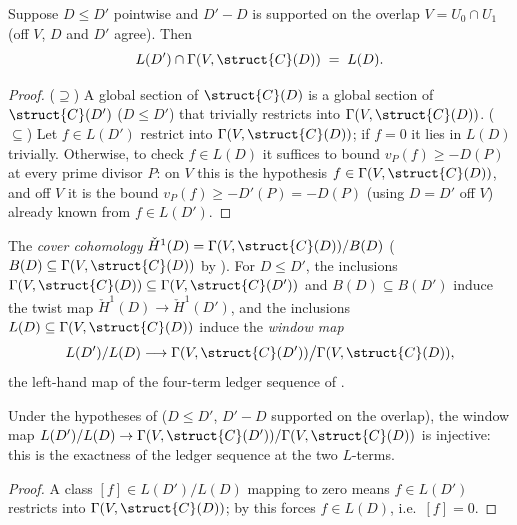 \begin{theorem}
  \label{thm:adelic_linearSystem_inf_overlap_eq}
  \leanok
  Suppose \(D \le D'\) pointwise and \(D' - D\) is supported on the
  overlap \(V = U_0 \cap U_1\) (off \(V\), \(D\) and \(D'\) agree). Then
  \[
    L(D') \cap \Gamma(V, \struct{C}(D)) \;=\; L(D).
  \]
\end{theorem}
\begin{proof}
  \leanok
  (\(\supseteq\)) A global section of \(\struct{C}(D)\) is a global
  section of \(\struct{C}(D')\) (\(D \le D'\)) that trivially restricts
  into \(\Gamma(V, \struct{C}(D))\). (\(\subseteq\)) Let \(f \in L(D')\)
  restrict into \(\Gamma(V, \struct{C}(D))\); if \(f = 0\) it lies in
  \(L(D)\) trivially. Otherwise, to check \(f \in L(D)\) it suffices to
  bound \(v_P(f) \ge -D(P)\) at every prime divisor \(P\): on \(V\) this
  is the hypothesis \(f \in \Gamma(V, \struct{C}(D))\), and off \(V\) it
  is the bound \(v_P(f) \ge -D'(P) = -D(P)\) (using \(D = D'\) off
  \(V\)) already known from \(f \in L(D')\).
\end{proof}

\begin{definition}
  \label{def:adelic_H1_window}
  \leanok
  The \emph{cover cohomology} \(\check{H}^1(D) = \Gamma(V,
  \struct{C}(D))/B(D)\) (\(B(D) \subseteq \Gamma(V, \struct{C}(D))\) by
  ). For \(D \le D'\), the
  inclusions \(\Gamma(V, \struct{C}(D)) \subseteq \Gamma(V,
  \struct{C}(D'))\) and \(B(D) \subseteq B(D')\) induce the twist map
  \(\check{H}^1(D) \to \check{H}^1(D')\), and the inclusions \(L(D)
  \subseteq \Gamma(V, \struct{C}(D))\) induce the \emph{window map}
  \[
    L(D')/L(D) \longrightarrow \Gamma(V, \struct{C}(D'))\big/
      \Gamma(V, \struct{C}(D)),
  \]
  the left-hand map of the four-term ledger sequence of
  .
\end{definition}

\begin{theorem}
  \label{thm:adelic_windowMap_injective}
  \leanok
  Under the hypotheses of 
  (\(D \le D'\), \(D' - D\) supported on the overlap), the window map
  \(L(D')/L(D) \to \Gamma(V, \struct{C}(D'))/\Gamma(V, \struct{C}(D))\)
  is injective: this is the exactness of the ledger sequence at the two
  \(L\)-terms.
\end{theorem}
\begin{proof}
  \leanok
  A class \([f] \in L(D')/L(D)\) mapping to zero means \(f \in L(D')\)
  restricts into \(\Gamma(V, \struct{C}(D))\); by
   this forces \(f \in
  L(D)\), i.e.\ \([f] = 0\).
\end{proof}

